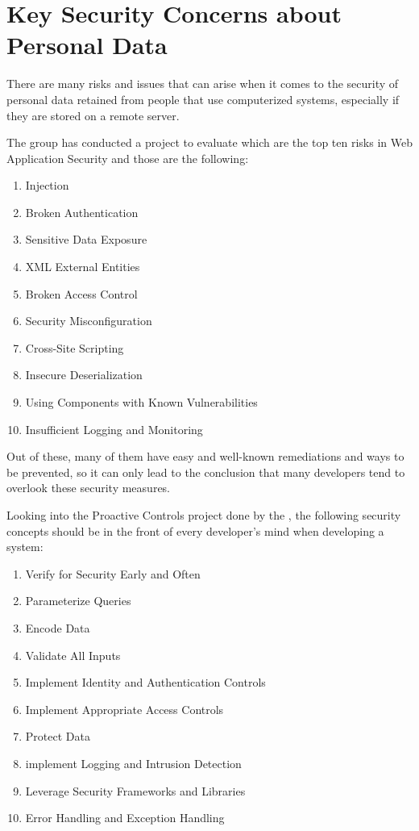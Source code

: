 \chapter{Key Security Concerns about Personal Data}

There are many risks and issues that can arise when it comes to the security of personal data retained from people that use computerized systems, especially if they are stored on a remote server.

The \cite{OWASP_Top_10} group has conducted a project to evaluate which are the top ten risks in Web Application Security and those are the following:
\begin{enumerate}
  \item Injection
  \item Broken Authentication
  \item Sensitive Data Exposure
  \item XML External Entities
  \item Broken Access Control
  \item Security Misconfiguration
  \item Cross-Site Scripting
  \item Insecure Deserialization
  \item Using Components with Known Vulnerabilities
  \item Insufficient Logging and Monitoring
\end{enumerate}

Out of these, many of them have easy and well-known remediations and ways to be prevented, so it can only lead to the conclusion that many developers tend to overlook these security measures.

Looking into the Proactive Controls project done by the \cite{ProactiveControls}, the following security concepts should be in the front of every developer's mind when developing a system:
\begin{enumerate}
  \item Verify for Security Early and Often
  \item Parameterize Queries
  \item Encode Data
  \item Validate All Inputs
  \item Implement Identity and Authentication Controls
  \item Implement Appropriate Access Controls
  \item Protect Data
  \item implement Logging and Intrusion Detection
  \item Leverage Security Frameworks and Libraries
  \item Error Handling and Exception Handling
\end{enumerate}
